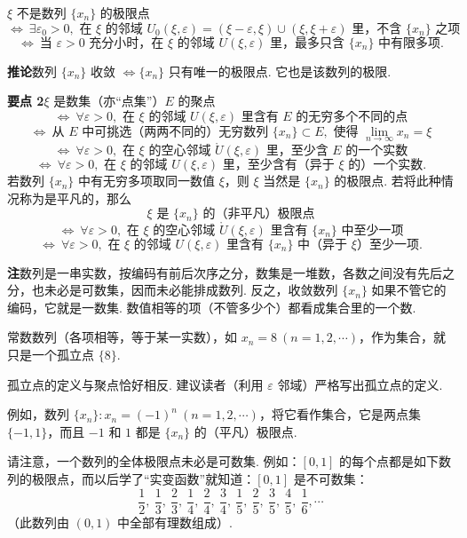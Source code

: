 \documentclass[UTF8, 12pt, fontset=fandol, oneside]{ctexart}
\begin{document}
$\xi$ 不是数列 $\{x_n\}$ 的极限点
\[
\Longleftrightarrow\ \exists\varepsilon_0>0,\text{ 在 }\xi\text{ 的邻域 }U_0(\xi,\varepsilon)=(\xi-\varepsilon,\xi)\cup(\xi,\xi+\varepsilon)\text{ 里，不含 }\{x_n\}\text{ 之项}
\]
\[
\Longleftrightarrow\ \text{当 }\varepsilon>0\text{ 充分小时，在 }\xi\text{ 的邻域 }U(\xi,\varepsilon)\text{ 里，最多只含 }\{x_n\}\text{ 中有限多项}.
\]

\noindent\textbf{推论}\quad 数列 $\{x_n\}$ 收敛 $\Longleftrightarrow \{x_n\}$ 只有唯一的极限点. 它也是该数列的极限.

\noindent\textbf{要点 2}\quad $\xi$ 是数集（亦“点集”）$E$ 的聚点
\[
\Longleftrightarrow\ \forall \varepsilon>0,\text{ 在 }\xi\text{ 的邻域 }U(\xi,\varepsilon)\text{ 里含有 }E\text{ 的无穷多个不同的点}
\]
\[
\Longleftrightarrow\ \text{从 }E\text{ 中可挑选（两两不同的）无穷数列 }\{x_n\}\subset E,\text{ 使得 }\lim_{n\to\infty}x_n=\xi
\]
\[
\Longleftrightarrow\ \forall \varepsilon>0,\text{ 在 }\xi\text{ 的空心邻域 }\mathring{U}(\xi,\varepsilon)\text{ 里，至少含 }E\text{ 的一个实数}
\]
\[
\Longleftrightarrow\ \forall \varepsilon>0,\text{ 在 }\xi\text{ 的邻域 }U(\xi,\varepsilon)\text{ 里，至少含有（异于 }\xi\text{ 的）一个实数}.
\]
若数列 $\{x_n\}$ 中有无穷多项取同一数值 $\xi$，则 $\xi$ 当然是 $\{x_n\}$ 的极限点. 若将此种情况称为是平凡的，那么
\[
  \xi\text{ 是 }\{x_n\}\text{ 的（非平凡）极限点}
\]
\[
\Longleftrightarrow\ \forall \varepsilon>0,\text{ 在 }\xi\text{ 的空心邻域 }\mathring{U}(\xi,\varepsilon)\text{ 里含有 }\{x_n\}\text{ 中至少一项}
\]
\[
\Longleftrightarrow\ \forall \varepsilon>0,\text{ 在 }\xi\text{ 的邻域 }U(\xi,\varepsilon)\text{ 里含有 }\{x_n\}\text{ 中（异于 }\xi\text{）至少一项}.
\]

\noindent\textbf{注}\quad 数列是一串实数，按编码有前后次序之分，数集是一堆数，各数之间没有先后之分，也未必是可数集，因而未必能排成数列. 反之，收敛数列 $\{x_n\}$ 如果不管它的编码，它就是一数集. 数值相等的项（不管多少个）都看成集合里的一个数.

常数数列（各项相等，等于某一实数），如 $x_n=8\ (n=1,2,\cdots)$，作为集合，就只是一个孤立点 $\{8\}$.

孤立点的定义与聚点恰好相反. 建议读者（利用 $\varepsilon$ 邻域）严格写出孤立点的定义.

例如，数列 $\{x_n\}:x_n=(-1)^n\ (n=1,2,\cdots)$，将它看作集合，它是两点集 $\{-1,1\}$，而且 $-1$ 和 $1$ 都是 $\{x_n\}$ 的（平凡）极限点.

请注意，一个数列的全体极限点未必是可数集. 例如：$[0,1]$ 的每个点都是如下数列的极限点，而以后学了“实变函数”就知道：$[0,1]$ 是不可数集：
\[
  \frac12,\ \frac13,\ \frac23,\ \frac14,\ \frac24,\ \frac34,\ \frac15,\ \frac25,\ \frac35,\ \frac45,\ \frac16,\cdots
\]
（此数列由 $(0,1)$ 中全部有理数组成）.
\end{document}
